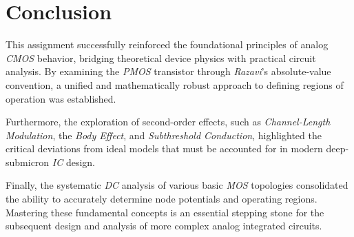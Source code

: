 \documentclass[12pt,a4paper]{article}
\begin{document}
\section{Conclusion}
This assignment successfully reinforced the foundational principles of analog \textit{CMOS} behavior, bridging theoretical device physics with practical circuit analysis. By examining the \textit{PMOS} transistor through \textit{Razavi}'s absolute-value convention, a unified and mathematically robust approach to defining regions of operation was established. 

Furthermore, the exploration of second-order effects, such as \textit{Channel-Length Modulation}, the \textit{Body Effect}, and \textit{Subthreshold Conduction}, highlighted the critical deviations from ideal models that must be accounted for in modern deep-submicron \textit{IC} design.

Finally, the systematic \textit{DC} analysis of various basic \textit{MOS} topologies consolidated the ability to accurately determine node potentials and operating regions. Mastering these fundamental concepts is an essential stepping stone for the subsequent design and analysis of more complex analog integrated circuits.



\newpage
\printbibliography[heading=bibintoc, title={6 \ Bibliography}]
\end{document}
